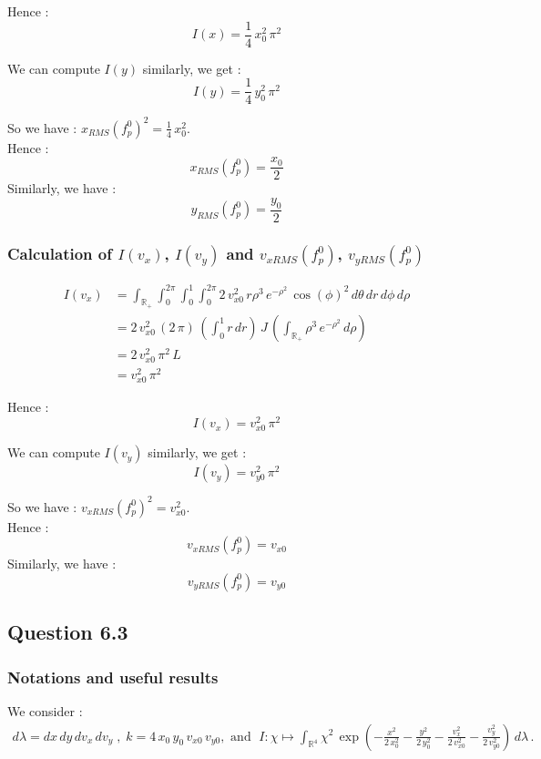 \documentclass[10pt]{article}
\begin{document}
Hence :
$$\boxed{I(x) = \frac{1}{4}\,x_0^2\,\pi^{2}}$$

We can compute $I(y)$ similarly, we get : 
$$\boxed{I(y) = \frac{1}{4}\,y_0^2\,\pi^{2}}$$

So we have : $x_{RMS}(f_p^0)^2 = \frac{1}{4}\,x_0^2 $. \\
Hence : 
$$\boxed{x_{RMS}(f_p^0) = \frac{x_0}{2}}$$
Similarly, we have : 
$$\boxed{y_{RMS}(f_p^0) = \frac{y_0}{2}}$$

\subsubsection{Calculation of $I(v_x)$, $I(v_y)$ and $v_{xRMS}(f_p^0)$, $v_{yRMS}(f_p^0)$}

\begin{align*}
I(v_x) &= \int_{\mathbb{R}_{+}}\int_0^{2\pi}\int_0^1\int_0^{2\pi} 2\,v_{x0}^2\,r\rho^3\, e^{-\rho^{2}}\,\cos(\phi)^2\,d\theta\,dr\,d\phi\,d\rho \\
&= 2\,v_{x0}^2\,(2\,\pi)\,\left(\int_{0}^{1} r\,dr\right)\,J\, \left(\int_{\mathbb{R}_{+}}\rho^{3}\,e^{-\rho^{2}}\,d\rho \right) \\
&= 2\,v_{x0}^2\,\pi^{2}\,L \\
&= v_{x0}^2\,\pi^{2}
\end{align*}

Hence :
$$\boxed{I(v_x) = v_{x0}^2\,\pi^{2}}$$

We can compute $I(v_y)$ similarly, we get : 
$$\boxed{I(v_y) = v_{y0}^2\,\pi^{2}}$$

So we have : $v_{xRMS}(f_p^0)^2 = v_{x0}^2 $. \\
Hence : 
$$\boxed{v_{xRMS}(f_p^0) = v_{x0}}$$
Similarly, we have : 
$$\boxed{v_{yRMS}(f_p^0) = v_{y0}}$$

\subsection{Question 6.3}

\subsubsection{Notations and useful results}

We consider : \\
$
\begin{array}{l}
d\lambda = dx\,dy\,dv_x\,dv_y \; , \; k = 4\,x_0\,y_0\,v_{x0}\,v_{y0} ,
 \mbox{ and } \;
I:\chi\mapsto\int_{\mathbb{R}^4} \chi^{2}\, \exp\left(-\frac{x^2}{2\,x_{0}^2}-\frac{y^2}{2\,y_{0}^2}-\frac{v_x^2}{2\,v_{x0}^2}-\frac{v_y^2}{2\,v_{y0}^2} \right) \,d\lambda \, .
\end{array}
$ \\
\end{document}
